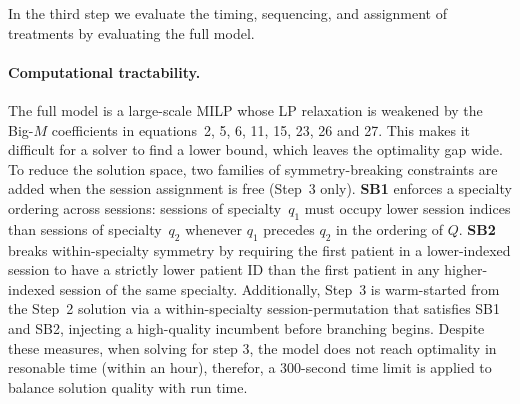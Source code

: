 In the third step we evaluate the timing, sequencing, and assignment of
treatments by evaluating the full model.

\paragraph{Computational tractability.}
The full model is a large-scale MILP whose LP relaxation is weakened by the
Big-$M$ coefficients in equations~2, 5, 6, 11, 15, 23, 26 and 27. This makes it difficult for a solver to find a lower bound, which leaves the optimality gap wide.
To reduce the solution space, two families of symmetry-breaking constraints are
added when the session assignment is free (Step~3 only).
\textbf{SB1} enforces a specialty ordering across sessions: sessions
of specialty~$q_1$ must occupy lower session indices than sessions of
specialty~$q_2$ whenever $q_1$ precedes $q_2$ in the ordering of $Q$.
\textbf{SB2} breaks within-specialty symmetry by requiring the first patient in
a lower-indexed session to have a strictly lower patient ID than the first
patient in any higher-indexed session of the same specialty.
Additionally, Step~3 is warm-started from the Step~2 solution via a
within-specialty session-permutation that satisfies SB1 and SB2, injecting a
high-quality incumbent before branching begins.
Despite these measures, when solving for step 3, the model does not reach optimality in resonable time (within an hour), therefor, a 300-second time limit 
is applied to balance solution quality with run time.